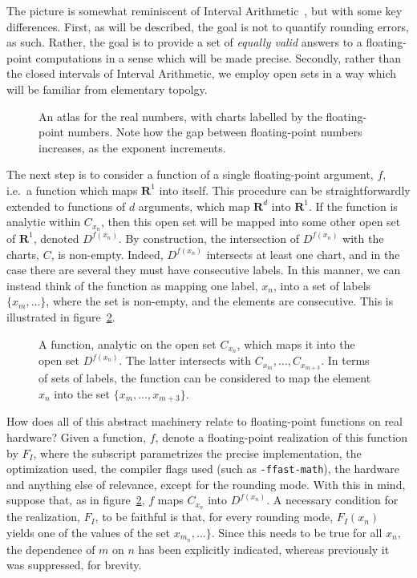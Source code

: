\documentclass[prd,twocolumn,amsmath,amssymb,nofootinbib,eqsecnum]{revtex4-1}
\newcommand{\code}[1]{{\tt #1}}
\newcommand{\ie}{i.e.}
\newcommand{\fig}[1]{figure~\ref{fig:#1}}
\begin{document}
The picture is somewhat reminiscent of Interval Arithmetic~\cite{Interval}, but with some key differences.
First, as will be described, the goal is not to quantify rounding errors, as such. Rather, the goal is to provide a set of \emph{equally valid} answers to a floating-point computations in a sense which will be made precise. Secondly, rather than the closed intervals of Interval Arithmetic, we employ open sets in a way which will be familiar from elementary topolgy.

\begin{figure}[h]
\begin{center}
\resizebox{25em}{!}{}
\caption{An atlas for the real numbers, with charts labelled by the floating-point numbers. Note how the gap between floating-point numbers increases, as the exponent increments.}
\label{fig:R1}
\end{center}
\end{figure}

The next step is to consider a function of a single floating-point argument, $f$, \ie\ a function which maps $\mathbf{R}^1$ into itself. This procedure can be straightforwardly extended to functions of $d$ arguments, which map $\mathbf{R}^d$ into $\mathbf{R}^1$. If the function is analytic within $C_{x_n}$, then this open set will be mapped into some other open set of $\mathbf{R}^1$, denoted $D^{f(x_n)}$. By construction, the intersection of $D^{f(x_n)}$ with the charts, $C$, is non-empty. Indeed, $D^{f(x_n)}$ intersects at least one chart, and in the case there are several they must have consecutive labels. In this manner, we can instead think of the function as mapping one label, $x_n$, into a set of labels $\{x_{m}, \ldots\}$, where the set is non-empty, and the elements are consecutive. This is illustrated in \fig{Function}.

\begin{figure}[h]
\begin{center}
\resizebox{25em}{!}{}
\caption{A function, analytic on the open set $C_{x_n}$, which maps it into the open set $D^{f(x_n)}$. The latter intersects with $C_{x_m}, \ldots, C_{x_{m+3}}$. In terms of sets of labels, the function can be considered to map the element $x_n$ into the set $\{x_m, \ldots, x_{m+3}\}$.}
\label{fig:Function}
\end{center}
\end{figure}

How does all of this abstract machinery relate to floating-point functions on real hardware? Given a function, $f$, denote a floating-point realization of this function by $F_I$, where the subscript parametrizes the precise implementation, the optimization used, the compiler flags used (such as \code{-ffast-math}), the hardware and anything else of relevance, except for the rounding mode. With this
in mind, suppose that, as in \fig{Function}, $f$ maps $C_{x_n}$ into $D^{f(x_n)}$. A necessary
condition for the realization, $F_I$, to be faithful is that, for every rounding mode, $F_I(x_n)$ yields
one of the values of the set ${x_{m_n}, \ldots\}}$. Since this needs to be true for all $x_n$, the dependence of $m$ on $n$ has been explicitly indicated, whereas previously it was suppressed, for brevity.
\end{document}
